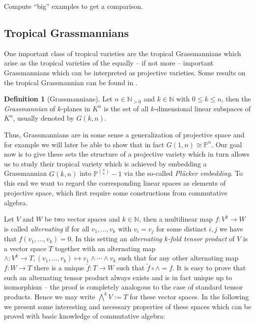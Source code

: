 \documentclass[
  paper=a4,
  DIV=14,
  fontsize=12pt,
  titlepage,
  bibliography=totoc,
  listof=totoc,
  pagesize=pdftex
]{scrartcl}
\numberwithin{figure}{section}
\numberwithin{equation}{section}
\numberwithin{table}{section}
\newcommand*\setN{\mathds{N}}
\newcommand*\setP{\mathds{P}}
\theoremstyle{definition}
\newtheorem{definition}{Definition}
\numberwithin{definition}{section}
\begin{document}
Compute \enquote{big} examples to get a comparison.

\subsection{Tropical Grassmannians}

One important class of tropical varieties are the tropical Grassmannians which arise as
the tropical varieties of the equally -- if not more -- important Grassmannians which can
be interpreted as projective varieties. Some results on the tropical Grassmannian can be
found in \cite{tropGrass}.

\begin{definition}[Grassmannians]
  Let $n \in \setN_{>0}$ and $k \in \setN$ with $0 \leq k \leq n$, then the
  \emph{Grassmannian} of $k$-planes in $K^n$ is the set of all $k$-dimensional linear
  subspaces of $K^n$, usually denoted by $G(k, n)$.
\end{definition}

Thus, Grassmannians are in some sense a generalization of projective space and for example
we will later be able to show that in fact $G(1,n) \cong \setP^n$. Our goal now is to
give these sets the structure of a projective variety which in turn allows us to study their
tropical variety which is achieved by embedding a Grassmannian $G(k, n)$ into $\setP^{\binom
nk}-1$ via the so-called \emph{Plücker embedding}. To this end we want to regard the
corresponding linear spaces as elements of projective space, which first require some
constructions from commutative algebra.

Let $V$ and $W$ be two vector spaces and $k\in\setN$, then a multilinear map $f : V^k \to
W$ is called \emph{alternating} if for all $v_1, \dots, v_k$ with $v_i=v_j$ for some
distinct $i,j$ we have that $f(v_1, \dots, v_k) = 0$. In this setting an \emph{alternating
$k$-fold tensor product} of $V$ is a vector space $T$ together with an alternating map
$\wedge:V^k\to T, (v_1, \dots, v_k) \mapsto v_1\wedge\cdots\wedge v_k$ such that for any
other alternating map $f:W\to T$ there is a unique $\tilde f:T\to W$ such that $\tilde f
\circ \wedge = f$. It is easy to prove that such an alternating tensor product always
exists and is in fact unique up to isomorphism -- the proof is completely analogous to the
case of standard tensor products. Hence we may write $\bigwedge^k V := T$ for these vector
spaces. In the following we present some interesting and necessary properties of these
spaces which can be proved with basic knowledge of commutative algebra:
\end{document}
